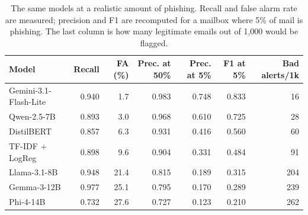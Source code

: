 \begin{table}[t]
\caption{The same models at a realistic amount of phishing. Recall and false alarm rate are measured; precision and F1 are recomputed for a mailbox where 5\% of mail is phishing. The last column is how many legitimate emails out of 1{,}000 would be flagged.}
\label{tab:baserate}
\centering\footnotesize
\setlength{\tabcolsep}{4pt}
\begin{tabular}{lrrrrrr}
\toprule
Model & Recall & FA (\%) & Prec. at 50\% & Prec. at 5\% & F1 at 5\% & Bad alerts/1k \\
\midrule
Gemini-3.1-Flash-Lite & 0.940 & 1.7 & 0.983 & 0.748 & 0.833 & 16 \\
Qwen-2.5-7B & 0.893 & 3.0 & 0.968 & 0.610 & 0.725 & 28 \\
DistilBERT & 0.857 & 6.3 & 0.931 & 0.416 & 0.560 & 60 \\
TF-IDF + LogReg & 0.898 & 9.6 & 0.904 & 0.331 & 0.484 & 91 \\
Llama-3.1-8B & 0.948 & 21.4 & 0.815 & 0.189 & 0.315 & 204 \\
Gemma-3-12B & 0.977 & 25.1 & 0.795 & 0.170 & 0.289 & 239 \\
Phi-4-14B & 0.732 & 27.6 & 0.727 & 0.123 & 0.210 & 262 \\
\bottomrule
\end{tabular}
\end{table}
